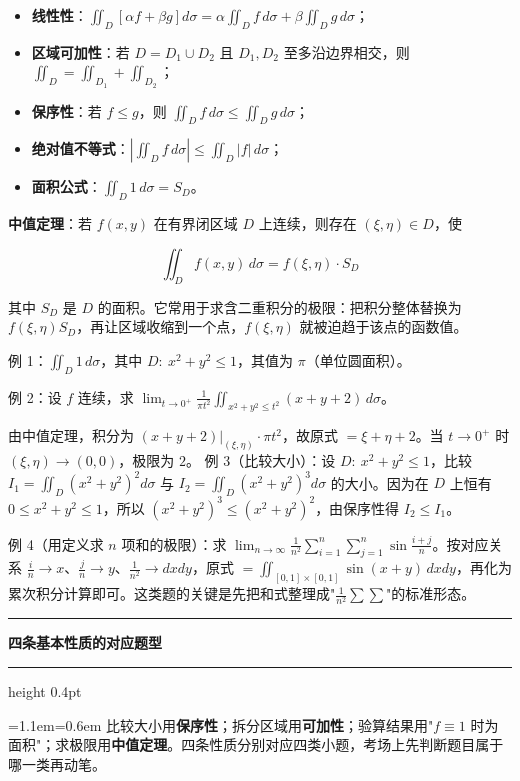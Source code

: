 \documentclass[11pt,openany,UTF8]{ctexbook}
\newcommand{\callouthead}[2]{%
  \par\addvspace{7pt}\noindent
  {\color{#1}\rule[-0.15em]{3pt}{1.05em}}\hspace{0.5em}%
  {\bfseries\color{#1}#2}\par\nobreak\vspace{-0.35em}%
  {\color{rulesep}\hrule height 0.4pt}\nobreak\vspace{0.45em}%
  \begingroup\small\setlength{\parindent}{0pt}%
  \leftskip=1.1em\rightskip=0.6em\noindent\ignorespaces}
\newcommand{\calloutend}{\par\endgroup\addvspace{7pt}}
\newenvironment{callkey}[1]{\callouthead{keybar}{#1}}{\calloutend}
\begin{document}
\begin{itemize}
\item \textbf{线性性}：$\iint_{D}\left[\alpha f+\beta g\right]d\sigma=\alpha\iint_{D}f\,d\sigma+\beta\iint_{D}g\,d\sigma$；
\item \textbf{区域可加性}：若 $D=D_1\cup D_2$ 且 $D_1,D_2$ 至多沿边界相交，则 $\iint_{D}=\iint_{D_1}+\iint_{D_2}$；
\item \textbf{保序性}：若 $f\le g$，则 $\iint_{D}f\,d\sigma\le \iint_{D}g\,d\sigma$；
\item \textbf{绝对值不等式}：$\left\vert \iint_{D}f\,d\sigma\right\vert \le \iint_{D}\vert f\vert\,d\sigma$；
\item \textbf{面积公式}：$\iint_{D}1\,d\sigma=S_D$。
\end{itemize}
\textbf{中值定理}：若 $f(x,y)$ 在有界闭区域 $D$ 上连续，则存在 $(\xi,\eta)\in D$，使

\[\iint_{D}f(x,y)\,d\sigma=f(\xi,\eta)\cdot S_D\]

其中 $S_D$ 是 $D$ 的面积。它常用于求含二重积分的极限：把积分整体替换为 $f(\xi,\eta)S_D$，再让区域收缩到一个点，$f(\xi,\eta)$ 就被迫趋于该点的函数值。

例 1：$\iint_{D}1\,d\sigma$，其中 $D:\ x^{2}+y^{2}\le 1$，其值为 $\pi$（单位圆面积）。

例 2：设 $f$ 连续，求 $\displaystyle\lim_{t\to 0^{+}}\frac{1}{\pi t^{2}}\iint_{x^{2}+y^{2}\le t^{2}}(x+y+2)\,d\sigma$。

由中值定理，积分为 $\left.(x+y+2)\right\vert_{(\xi,\eta)}\cdot\pi t^{2}$，故原式 $=\xi+\eta+2$。当 $t\to 0^{+}$ 时 $(\xi,\eta)\to(0,0)$，极限为 $2$。 例 3（比较大小）：设 $D:\ x^{2}+y^{2}\le 1$，比较 $I_1=\iint_{D}(x^{2}+y^{2})^{2}d\sigma$ 与 $I_2=\iint_{D}(x^{2}+y^{2})^{3}d\sigma$ 的大小。因为在 $D$ 上恒有 $0\le x^{2}+y^{2}\le 1$，所以 $(x^{2}+y^{2})^{3}\le(x^{2}+y^{2})^{2}$，由保序性得 $I_2\le I_1$。

例 4（用定义求 $n$ 项和的极限）：求 $\displaystyle\lim_{n\to\infty}\frac{1}{n^{2}}\sum_{i=1}^{n}\sum_{j=1}^{n}\sin\frac{i+j}{n}$。按对应关系 $\frac in\to x$、$\frac jn\to y$、$\frac{1}{n^{2}}\to dxdy$，原式 $=\iint_{[0,1]\times[0,1]}\sin(x+y)\,dxdy$，再化为累次积分计算即可。这类题的关键是先把和式整理成"$\frac{1}{n^{2}}\sum\sum$"的标准形态。

\begin{callkey}{四条基本性质的对应题型}
比较大小用\textbf{保序性}；拆分区域用\textbf{可加性}；验算结果用"$f\equiv 1$ 时为面积"；求极限用\textbf{中值定理}。四条性质分别对应四类小题，考场上先判断题目属于哪一类再动笔。

\end{callkey}
\end{document}

